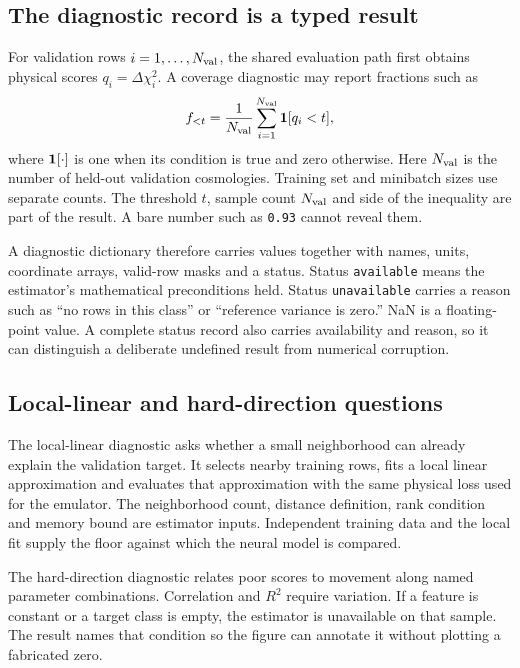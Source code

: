 \documentclass[10pt,aps,prd,twocolumn,nofootinbib]{revtex4-2}
\newcommand{\code}[1]{\texttt{#1}}
\begin{document}
\subsection{The diagnostic record is a typed result}

For validation rows \(i=1,\ldots,N_{\rm val}\), the shared evaluation path first obtains
physical scores \(q_i=\Delta\chi_i^2\).  A coverage diagnostic may report
fractions such as
\begin{equation*}
 f_{<t}=\frac{1}{N_{\rm val}}
         \sum_{i=1}^{N_{\rm val}}{\bf 1}[q_i<t],
\end{equation*}
where \({\bf 1}[\cdot]\) is one when its condition is true and zero otherwise.
Here $N_{\rm val}$ is the number of held-out validation cosmologies.  Training
set and minibatch sizes use separate counts.  The threshold \(t\), sample count
\(N_{\rm val}\) and side of the inequality are part
of the result.  A bare number such as \code{0.93} cannot reveal them.

A diagnostic dictionary therefore carries values together with names, units,
coordinate arrays, valid-row masks and a status.  Status \code{available}
means the estimator's mathematical preconditions held.  Status
\code{unavailable} carries a reason such as ``no rows in this class'' or
``reference variance is zero.''  NaN is a floating-point value.  A complete
status record also carries availability and reason, so it can distinguish a deliberate undefined result from
numerical corruption.

\subsection{Local-linear and hard-direction questions}

The local-linear diagnostic asks whether a small neighborhood can already
explain the validation target.  It selects nearby training rows, fits a local
linear approximation and evaluates that approximation with the same physical
loss used for the emulator.  The neighborhood count, distance definition,
rank condition and memory bound are estimator inputs.  Independent training
data and the local fit supply the floor against which the neural model is
compared.

The hard-direction diagnostic relates poor scores to movement along named
parameter combinations.  Correlation and \(R^2\) require variation.  If a
feature is constant or a target class is empty, the estimator is unavailable
on that sample.  The result names that condition so the figure can annotate it without
plotting a fabricated zero.
\end{document}
